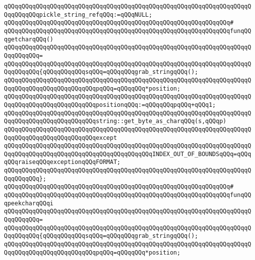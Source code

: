 \verb|qQQqqQQqqQQqqQQqqQQqqQQqqQQqqQQqqQQqqQQqqQQqqQQqqQQqqQQqqQQqqQQqqQQqqQQqqQQqqQQqpickle_string_refqQQq:=qQQqNULL;|\newline
\newline
\verb|qQQqqQQqqQQqqQQqqQQqqQQqqQQqqQQqqQQqqQQqqQQqqQQqqQQqqQQqqQQqqQQq#|\newline
\verb|qQQqqQQqqQQqqQQqqQQqqQQqqQQqqQQqqQQqqQQqqQQqqQQqqQQqqQQqqQQqqQQqfunqQQqgetcharqQQq()|\newline
\verb|qQQqqQQqqQQqqQQqqQQqqQQqqQQqqQQqqQQqqQQqqQQqqQQqqQQqqQQqqQQqqQQqqQQqqQQqqQQqqQQq=|\newline
\verb|qQQqqQQqqQQqqQQqqQQqqQQqqQQqqQQqqQQqqQQqqQQqqQQqqQQqqQQqqQQqqQQqqQQqqQQqqQQqqQQq{qQQqqQQqqQQqsqQQq=qQQqqQQqgrab_stringqQQq();|\newline
\verb|qQQqqQQqqQQqqQQqqQQqqQQqqQQqqQQqqQQqqQQqqQQqqQQqqQQqqQQqqQQqqQQqqQQqqQQqqQQqqQQqqQQqqQQqqQQqqQQqpqQQq=qQQqqQQq*position;|\newline
\newline
\verb|qQQqqQQqqQQqqQQqqQQqqQQqqQQqqQQqqQQqqQQqqQQqqQQqqQQqqQQqqQQqqQQqqQQqqQQqqQQqqQQqqQQqqQQqqQQqqQQqpositionqQQq:=qQQqqQQqpqQQq+qQQq1;|\newline
\newline
\verb|qQQqqQQqqQQqqQQqqQQqqQQqqQQqqQQqqQQqqQQqqQQqqQQqqQQqqQQqqQQqqQQqqQQqqQQqqQQqqQQqqQQqqQQqqQQqqQQqstring::get_byte_as_charqQQq(s,qQQqp)|\newline
\verb|qQQqqQQqqQQqqQQqqQQqqQQqqQQqqQQqqQQqqQQqqQQqqQQqqQQqqQQqqQQqqQQqqQQqqQQqqQQqqQQqqQQqqQQqqQQqqQQqexcept|\newline
\verb|qQQqqQQqqQQqqQQqqQQqqQQqqQQqqQQqqQQqqQQqqQQqqQQqqQQqqQQqqQQqqQQqqQQqqQQqqQQqqQQqqQQqqQQqqQQqqQQqqQQqqQQqqQQqqQQqINDEX_OUT_OF_BOUNDSqQQq=qQQqqQQqraiseqQQqexceptionqQQqFORMAT;|\newline
\verb|qQQqqQQqqQQqqQQqqQQqqQQqqQQqqQQqqQQqqQQqqQQqqQQqqQQqqQQqqQQqqQQqqQQqqQQqqQQqqQQq};|\newline
\verb|qQQqqQQqqQQqqQQqqQQqqQQqqQQqqQQqqQQqqQQqqQQqqQQqqQQqqQQqqQQqqQQq#|\newline
\verb|qQQqqQQqqQQqqQQqqQQqqQQqqQQqqQQqqQQqqQQqqQQqqQQqqQQqqQQqqQQqqQQqfunqQQqpeekcharqQQqi|\newline
\verb|qQQqqQQqqQQqqQQqqQQqqQQqqQQqqQQqqQQqqQQqqQQqqQQqqQQqqQQqqQQqqQQqqQQqqQQqqQQqqQQq=|\newline
\verb|qQQqqQQqqQQqqQQqqQQqqQQqqQQqqQQqqQQqqQQqqQQqqQQqqQQqqQQqqQQqqQQqqQQqqQQqqQQqqQQq{qQQqqQQqqQQqsqQQq=qQQqqQQqgrab_stringqQQq();|\newline
\verb|qQQqqQQqqQQqqQQqqQQqqQQqqQQqqQQqqQQqqQQqqQQqqQQqqQQqqQQqqQQqqQQqqQQqqQQqqQQqqQQqqQQqqQQqqQQqqQQqpqQQq=qQQqqQQq*position;|\newline
